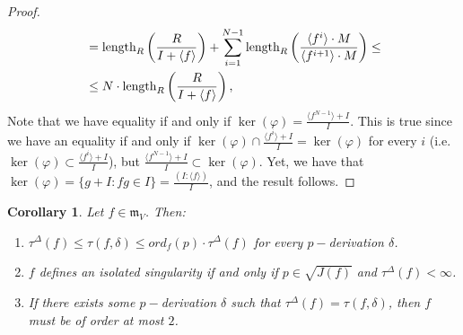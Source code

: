 \documentclass{article}
\newtheorem{remark}[theorem]{Remark}
\newtheorem{corollary}[theorem]{Corollary}
\newcommand{\maxV}{\mathfrak{m}_V}
\numberwithin{theorem}{section}
\begin{document}
\begin{proof}
\begin{equation*}
\begin{split}
        &=\textup{length}_{R}\left(\frac{R}{I + \langle f \rangle}\right) + \sum_{i=1}^{N-1} \textup{length}_{R}\left(\frac{\langle f^i \rangle \cdot M }{ \langle f^{i+1} \rangle \cdot M }\right) \leq\\
        &\leq N \cdot \textup{length}_{R}\left(\frac{R}{I + \langle f \rangle}\right), 
    \end{split}
    \end{equation*}
    Note that we have equality if and only if $\ker(\varphi) = \frac{\langle f^{N -1} \rangle +I}{I}$. This is true since we have an equality if and only if $\ker\left(\varphi\right) \cap \frac{\langle f^i \rangle+I}{I} = \ker\left(\varphi\right)$ for every $i$ (i.e. $\ker(\varphi) \subset \frac{\langle f^i \rangle+I}{I}$), but $ \frac{\langle f^{N-1} \rangle + I}{I} \subset \ker\left(\varphi\right)$. Yet, we have that $\ker(\varphi) = \{g+I \colon fg \in I \} = \frac{(I \colon \langle f \rangle)}{I}$, and the result follows. 
\end{proof}





\begin{corollary}\label{prop:upper_bound_tau}
    Let $f \in \maxV$. Then:
    \begin{enumerate}
        \item $\tau^\Delta \left(f\right) \leq \tau(f, \delta) \leq ord_{f}\left(p\right) \cdot \tau^\Delta\left(f\right)$ for every $p-$derivation $\delta$. 
        \item $f$ defines an isolated singularity if and only if $ p \in \sqrt{J\left(f\right)}$ and $\tau^\Delta\left(f\right) < \infty$.
        \item If there exists some $p-$derivation $\delta$ such that $\tau^\Delta\left(f\right) = \tau(f, \delta)$, then $f$ must be of order at most $2$. 
    \end{enumerate}
\end{corollary}
    
\end{document}
